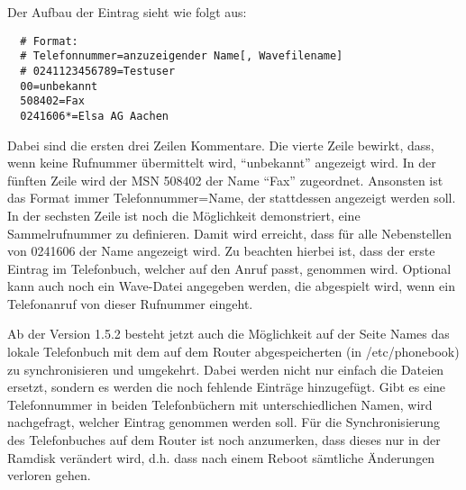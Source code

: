 \begin{itemize}
    Der Aufbau der Eintrag sieht wie folgt aus:

\begin{example}
\begin{verbatim}
  # Format:
  # Telefonnummer=anzuzeigender Name[, Wavefilename]
  # 0241123456789=Testuser
  00=unbekannt
  508402=Fax
  0241606*=Elsa AG Aachen
\end{verbatim}
\end{example}

    Dabei sind die ersten drei Zeilen Kommentare. Die vierte Zeile
    bewirkt, dass, wenn keine Rufnummer übermittelt wird,
    ``unbekannt'' angezeigt wird. In der fünften Zeile wird der MSN
    508402 der Name ``Fax'' zugeordnet. Ansonsten ist das Format immer
    Telefonnummer=Name, der stattdessen angezeigt werden soll. In der
    sechsten Zeile ist noch die Möglichkeit demonstriert, eine
    Sammelrufnummer zu definieren. Damit wird erreicht, dass für alle
    Nebenstellen von 0241606 der Name angezeigt wird. Zu beachten
    hierbei ist, dass der erste Eintrag im Telefonbuch, welcher auf
    den Anruf passt, genommen wird. Optional kann auch noch ein
    Wave-Datei angegeben werden, die abgespielt wird, wenn ein
    Telefonanruf von dieser Rufnummer eingeht.

    Ab der Version 1.5.2 besteht jetzt auch die Möglichkeit auf der
    Seite Names das lokale Telefonbuch mit dem auf dem Router
    abgespeicherten (in /etc/phonebook) zu synchronisieren und
    umgekehrt. Dabei werden nicht nur einfach die Dateien ersetzt,
    sondern es werden die noch fehlende Einträge hinzugefügt. Gibt es
    eine Telefonnummer in beiden Telefonbüchern mit unterschiedlichen
    Namen, wird nachgefragt, welcher Eintrag genommen werden soll. Für
    die Synchronisierung des Telefonbuches auf dem Router ist noch
    anzumerken, dass dieses nur in der Ramdisk verändert wird, d.h.
    dass nach einem Reboot sämtliche Änderungen verloren gehen.


\end{itemize}
